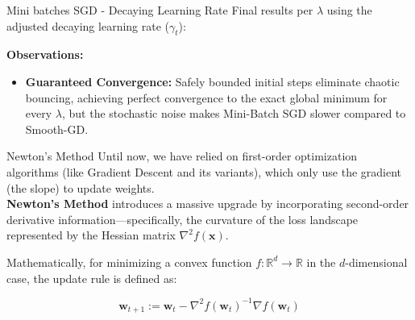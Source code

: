 \documentclass[10pt]{beamer}
\begin{document}
\begin{frame}{Mini batches SGD - Decaying Learning Rate}
    \small
    Final results per $\lambda$ using the adjusted decaying learning rate ($\gamma_t$):

    \vspace{0.4cm}
    \begin{table}[]
        \centering
    \end{table}

    \vspace{0.4cm}
    \textbf{Observations:}
    \begin{itemize}
        \item \textbf{Guaranteed Convergence:} Safely bounded initial steps eliminate chaotic bouncing, achieving perfect convergence to the exact global minimum for every $\lambda$, but the stochastic noise makes Mini-Batch SGD slower compared to Smooth-GD.
    \end{itemize}
\end{frame}

\begin{frame}{Newton's Method}
    Until now, we have relied on first-order optimization algorithms (like Gradient Descent and its variants), which only use the gradient (the slope) to update weights. \\[0.2cm]
    \textbf{Newton's Method} introduces a massive upgrade by incorporating second-order derivative information—specifically, the curvature of the loss landscape represented by the Hessian matrix $\nabla^2 f(\mathbf{x})$. 

    \vspace{0.4cm}
    Mathematically, for minimizing a convex function $f: \mathbb{R}^d \rightarrow \mathbb{R}$ in the $d$-dimensional case, the update rule is defined as:

    $$\mathbf{w}_{t+1} := \mathbf{w}_t - \nabla^2 f(\mathbf{w}_t)^{-1}\nabla f(\mathbf{w}_t)$$
\end{frame}
\end{document}
